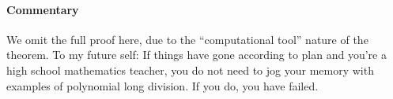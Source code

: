 \documentclass[letterpaper, 12pt]{article}
\begin{document}
			\paragraph*{\color{blue}Commentary}
			\color{blue}
			We omit the full proof here, due to the ``computational tool'' nature of the theorem.
			To my future self: If things have gone according to plan and you're a high school mathematics teacher, you do not need to jog your memory with examples of polynomial long division.
			If you do, you have failed.
			\color{black}


\end{document}
